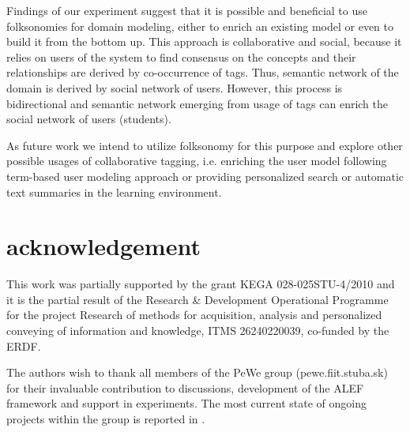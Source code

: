 \documentclass{IEEEtran}     %
\begin{document}
Findings of our experiment suggest that it is possible and
beneficial to use folksonomies for domain modeling, either
to enrich an existing model or even to build it from the
bottom up. This approach is collaborative and social, because
it relies on users of the system to find consensus on the
concepts and their relationships are derived by co-occurrence
of tags. Thus, semantic network of the domain is derived by
social network of users. However, this process is
bidirectional and semantic network emerging from usage of
tags can enrich the social network of users (students).

As future work we intend to utilize folksonomy for this
purpose and explore other possible usages of collaborative
tagging, i.e. enriching the user model following term-based
user modeling approach \cite{barla2011towards} or providing personalized search
or automatic text summaries in the learning environment.

\section*{acknowledgement}

This work was partially supported by the grant KEGA
028-025STU-4/2010 and it is the partial result of the
Research \& Development Operational Programme for the
project Research of methods for acquisition, analysis and
personalized conveying of information and knowledge,
ITMS 26240220039, co-funded by the ERDF.

The authors wish to thank all members of the PeWe
group (pewe.fiit.stuba.sk) for their invaluable contribution to
discussions, development of the ALEF framework and
support in experiments. The most current state of ongoing
projects within the group is reported in \cite{Moro:2011:TCM:2052137.2052242}.

\end{document}
